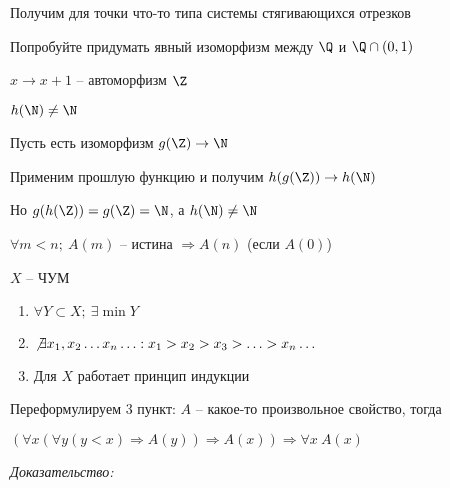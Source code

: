 \documentclass[12pt]{article}
\begin{document}
Получим для точки что-то типа системы стягивающихся отрезков

\begin{Exercise}{}
    Попробуйте придумать явный изоморфизм между $\Q$ и $\Q \cap (0, 1)$
\end{Exercise}

\begin{Remark}{}
    $x \to x + 1$ -- автоморфизм $\Z$

    $h(\N) \neq \N$

    Пусть есть изоморфизм $g(\Z) \to \N$

    Применим прошлую функцию и получим $h(g(\Z)) \to h(\N)$

    Но $g(h(\Z)) = g(\Z) = \N$, а $h(\N) \neq \N$
\end{Remark}

\begin{nota}{}
    $\forall m < n;\ A(m)$ -- истина $\Rightarrow A(n)$ (если $A(0)$)
\end{nota}

\begin{theo}{}
    $X$ -- ЧУМ

    \begin{enumerate}
        \item $\forall Y \subset X;\ \exists \min Y$
        \item $\not\exists x_1, x_2 \ldots x_n \ldots : x_1 > x_2 > x_3 > \ldots > x_n \ldots$
        \item Для $X$ работает принцип индукции
    \end{enumerate}
\end{theo}

\begin{Remark}{}
    Переформулируем 3 пункт: $A$ -- какое-то произвольное свойство, тогда

    $(\forall x(\forall y(y < x) \Rightarrow A(y)) \Rightarrow A(x)) \Rightarrow \forall x\ A(x)$
\end{Remark}

\textit{Доказательство:}
\end{document}
